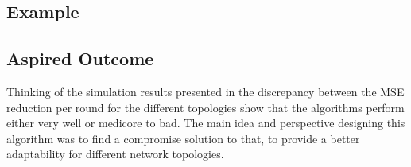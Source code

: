 \subsection{Example}\label{subsec:exampleAdaptiveThresholdPPS}
\begin{center}
    
\end{center}
\begin{center}
    
\end{center}
\subsection{Aspired Outcome}\label{subsec:aspiredOutcomeAdaptiveThresholdPPS}
Thinking of the simulation results presented in \cite{Bayazitoglu} the discrepancy between the MSE reduction per round for the different topologies show that the algorithms perform either very well or medicore to bad. The main idea and perspective designing this algorithm was to find a compromise solution to that, to provide a better adaptability for different network topologies.

